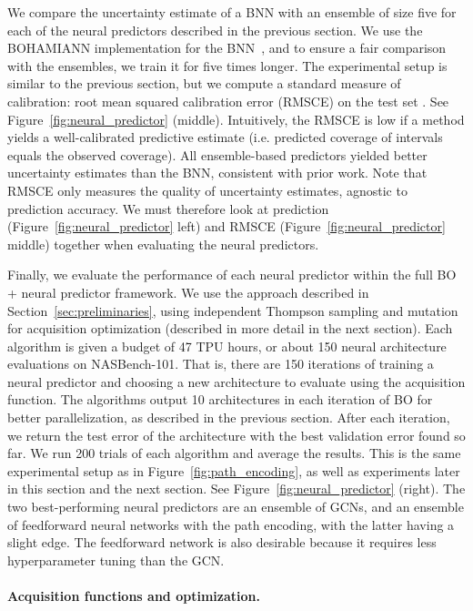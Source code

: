 \documentclass[11pt]{article}
\numberwithin{equation}{section}
\numberwithin{figure}{section}
\theoremstyle{plain}
\theoremstyle{definition}
\begin{document}
We compare the uncertainty estimate of a BNN with an ensemble of size
five for each of the neural predictors described in the previous section.
We use the BOHAMIANN implementation for the BNN~\cite{springenberg2016bayesian}, 
and to ensure a fair comparison with the ensembles, 
we train it for five times longer.
The experimental setup is similar to the previous section, but we compute
a standard measure of calibration:
root mean squared calibration error (RMSCE) on the test set
\cite{kuleshov2018accurate, tran2020methods}.
See Figure~\ref{fig:neural_predictor} (middle).
Intuitively, the RMSCE is low if a method yields a well-calibrated predictive estimate
(i.e. predicted coverage of intervals equals the observed coverage).
All ensemble-based predictors yielded better uncertainty estimates than 
the BNN, consistent with prior work. 
Note that RMSCE only measures the quality of uncertainty estimates, agnostic to 
prediction accuracy.
We must therefore look at prediction (Figure~\ref{fig:neural_predictor} left) and
RMSCE (Figure~\ref{fig:neural_predictor} middle) together when evaluating the neural predictors.

Finally, we evaluate the performance of each neural predictor within the full
BO + neural predictor framework. We use the approach described in
Section~\ref{sec:preliminaries}, using independent Thompson sampling and mutation
for acquisition optimization (described in more detail in the next section).
Each algorithm is given a budget of 47 TPU hours, or about 150 neural architecture
evaluations on NASBench-101. That is, there are 150 iterations of training a
neural predictor and choosing a new architecture to evaluate using the
acquisition function.
The algorithms output 10 architectures in each iteration of BO for better
parallelization, as described in the previous section.
After each iteration, we return the test error of the architecture with
the best validation error found so far. We run 200 trials of each algorithm and
average the results. 
This is the same experimental setup as in Figure~\ref{fig:path_encoding},
as well as experiments later in this section and the next section.
See Figure~\ref{fig:neural_predictor} (right).
The two best-performing neural predictors are an ensemble of GCNs, and an
ensemble of feedforward neural networks with the path encoding, with the
latter having a slight edge. 
The feedforward network is also desirable because it
requires less hyperparameter tuning than the GCN.



\paragraph{Acquisition functions and optimization.}
\end{document}
